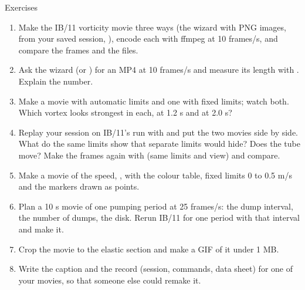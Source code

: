 \documentclass[aspectratio=169,11pt]{beamer}
\begin{document}
\begin{frame}{Exercises}
\label{fr:exercises}
\footnotesize
\begin{enumerate}\setlength{\itemsep}{1pt}
  \item Make the IB/11 vorticity movie three ways (the wizard with PNG images,  from your saved session, ), encode each with ffmpeg at 10 frames/s, and compare the frames and the files.
  \item Ask the wizard (or ) for an MP4 at 10 frames/s and measure its length with . Explain the number.
  \item Make a movie with automatic limits and one with fixed limits; watch both. Which vortex looks strongest in each, at 1.2 s and at 2.0 s?
  \item Replay your session on IB/11's  run with  and put the two movies side by side. What do the same limits show that separate limits would hide? Does the tube move? Make the  frames again with  (same limits and view) and compare.
  \item Make a movie of the speed, , with the  colour table, fixed limits 0 to 0.5 m/s and the markers drawn as points.
  \item Plan a 10 s movie of one pumping period at 25 frames/s: the dump interval, the number of dumps, the disk. Rerun IB/11 for one period with that interval and make it.
  \item Crop the movie to the elastic section and make a GIF of it under 1 MB.
  \item Write the caption and the record (session, commands, data sheet) for one of your movies, so that someone else could remake it.
\end{enumerate}
\end{frame}
\end{document}
